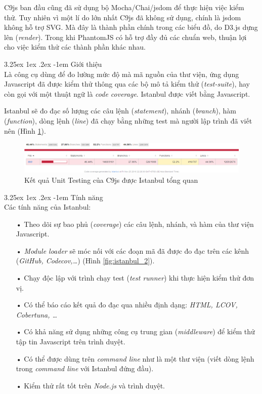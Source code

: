 \documentclass[12pt,a4paper,twoside]{article}
\makeatletter
\let\newcounter\@gobble\let\setcounter\@gobbletwo
\newcommand{\myparagraph}[1]{\paragraph{#1}\mbox{}\\} %
\newcounter{subsubsubsection}[subsubsection]
\renewcommand\paragraph{\@startsection{paragraph}{5}{\z@}%
  {3.25ex \@plus1ex \@minus.2ex}%
  {-1em}%
  {\normalfont\normalsize\bfseries}}
\makeatother
\begin{document}
C9js ban đầu cũng đã sử dụng bộ Mocha/Chai/jsdom để thực hiện việc kiểm thử. Tuy nhiên vì một lí do lớn nhất C9js đã không sử dụng, chính là jsdom không hỗ trợ SVG. Mà đây là thành phần chính trong các biểu đồ, do D3.js dựng lên (\textit{render}). Trong khi PhantomJS có hỗ trợ đầy đủ các chuẩn web, thuận lợi cho việc kiểm thử các thành phần khác nhau.

\label{sec:istanbul}
\myparagraph{Giới thiệu}
Là công cụ dùng để đo lường mức độ mà mã nguồn của thư viện, ứng dụng Javascript đã được kiểm thử thông qua các bộ mô tả kiểm thử (\textit{test-suite}), hay còn gọi với một thuật ngữ là \textit{code coverage}. Istanbul được viết bằng Javascript.

Istanbul sẽ đo đạc số lượng các câu lệnh (\textit{statement}), nhánh (\textit{branch}), hàm (\textit{function}), dòng lệnh (\textit{line}) đã chạy bằng những test mà người lập trình đã viết nên (Hình \ref{fig:istanbul_1}).

\begin{figure}[!h]
	\begin{center}
    \includegraphics[scale=.5]{image/istanbul_1}
    \caption{Kết quả Unit Testing của C9js được Istanbul tổng quan}
    \label{fig:istanbul_1}
	\end{center}
\end{figure}

\myparagraph{Tính năng}
Các tính năng của Istanbul:
\begin{itemize}
\item[•] Theo dõi sự bao phủ (\textit{coverage}) các câu lệnh, nhánh, và hàm của thư viện Javascript.
\item[•] \textit{Module loader} sẽ móc nối với các đoạn mã đã được đo đạc trên các kênh (\textit{GitHub, Codecov,…}) (Hình \ref{fig:istanbul_2}).
\item[•] Chạy độc lập với trình chạy test (\textit{test runner}) khi thực hiện kiểm thử đơn vị.
\item[•] Có thể báo cáo kết quả đo đạc qua nhiều định dạng: \textit{HTML, LCOV, Cobertuna, …}
\item[•] Có khả năng sử dụng những công cụ trung gian (\textit{middleware}) để kiểm thử tập tin Javascript trên trình duyệt.
\item[•] Có thể được dùng trên \textit{command line} như là một thư viện (viết dòng lệnh trong \textit{command line} với Istanbul đứng đầu).
\item[•] Kiểm thử rất tốt trên \textit{Node.js} và trình duyệt.
\end{itemize}
\end{document}
